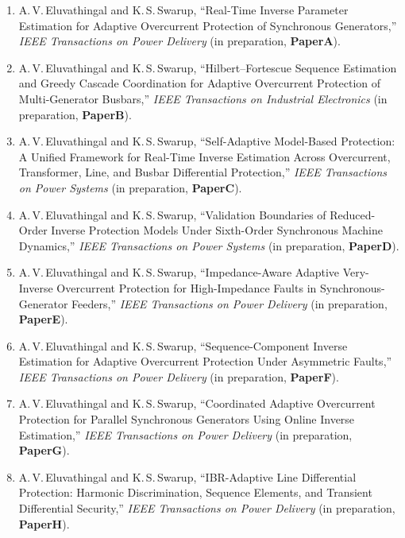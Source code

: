 \documentclass
    [phd,synopsis]
    {iitmdissertation}
\begin{document}
\begin{enumerate}

  \item A.\,V.\,Eluvathingal and K.\,S.\,Swarup,
    ``Real-Time Inverse Parameter Estimation for Adaptive Overcurrent
    Protection of Synchronous Generators,''
    \textit{IEEE Transactions on Power Delivery} (in preparation,
    \textbf{PaperA}).

  \item A.\,V.\,Eluvathingal and K.\,S.\,Swarup,
    ``Hilbert--Fortescue Sequence Estimation and Greedy Cascade
    Coordination for Adaptive Overcurrent Protection of Multi-Generator
    Busbars,''
    \textit{IEEE Transactions on Industrial Electronics} (in preparation,
    \textbf{PaperB}).

  \item A.\,V.\,Eluvathingal and K.\,S.\,Swarup,
    ``Self-Adaptive Model-Based Protection: A Unified Framework for
    Real-Time Inverse Estimation Across Overcurrent, Transformer, Line,
    and Busbar Differential Protection,''
    \textit{IEEE Transactions on Power Systems} (in preparation,
    \textbf{PaperC}).

  \item A.\,V.\,Eluvathingal and K.\,S.\,Swarup,
    ``Validation Boundaries of Reduced-Order Inverse Protection Models
    Under Sixth-Order Synchronous Machine Dynamics,''
    \textit{IEEE Transactions on Power Systems} (in preparation,
    \textbf{PaperD}).

  \item A.\,V.\,Eluvathingal and K.\,S.\,Swarup,
    ``Impedance-Aware Adaptive Very-Inverse Overcurrent Protection for
    High-Impedance Faults in Synchronous-Generator Feeders,''
    \textit{IEEE Transactions on Power Delivery} (in preparation,
    \textbf{PaperE}).

  \item A.\,V.\,Eluvathingal and K.\,S.\,Swarup,
    ``Sequence-Component Inverse Estimation for Adaptive Overcurrent
    Protection Under Asymmetric Faults,''
    \textit{IEEE Transactions on Power Delivery} (in preparation,
    \textbf{PaperF}).

  \item A.\,V.\,Eluvathingal and K.\,S.\,Swarup,
    ``Coordinated Adaptive Overcurrent Protection for Parallel
    Synchronous Generators Using Online Inverse Estimation,''
    \textit{IEEE Transactions on Power Delivery} (in preparation,
    \textbf{PaperG}).

  \item A.\,V.\,Eluvathingal and K.\,S.\,Swarup,
    ``IBR-Adaptive Line Differential Protection: Harmonic Discrimination,
    Sequence Elements, and Transient Differential Security,''
    \textit{IEEE Transactions on Power Delivery} (in preparation,
    \textbf{PaperH}).

\end{enumerate}
\end{document}
